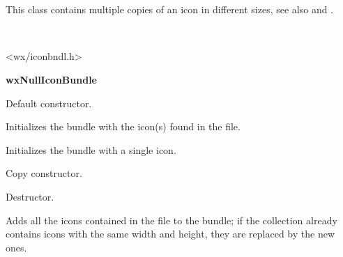 \section{}\label{wxiconbundle}

This class contains multiple copies of an icon in different sizes,
see also  and
.


\\


<wx/iconbndl.h>




{\bf wxNullIconBundle}



\label{wxiconbundlewxiconbundle}


Default constructor.


Initializes the bundle with the icon(s) found in the file.


Initializes the bundle with a single icon.


Copy constructor.


\label{wxiconbundledtor}


Destructor.


\label{wxiconbundleaddicon}


Adds all the icons contained in the file to the bundle;
if the collection already contains icons with the same
width and height, they are replaced by the new ones.

